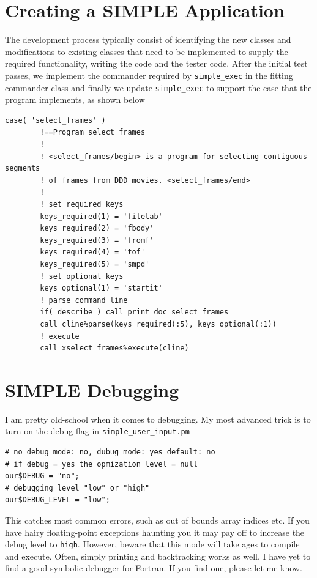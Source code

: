 \documentclass[a4paper,11pt]{article}
\begin{document}
\section{Creating a SIMPLE Application}
The development process typically consist of identifying the new classes and modifications to existing classes that need to be implemented to supply the required functionality, writing the code and the tester code. After the initial test passes,  we implement the commander required by \texttt{simple\_exec} in the fitting commander class and finally we update \texttt{simple\_exec} to support the case that the program implements, as shown below
\begin{verbatim}
case( 'select_frames' )
        !==Program select_frames
        !
        ! <select_frames/begin> is a program for selecting contiguous segments 
        ! of frames from DDD movies. <select_frames/end>
        !
        ! set required keys
        keys_required(1) = 'filetab'
        keys_required(2) = 'fbody'
        keys_required(3) = 'fromf'
        keys_required(4) = 'tof'
        keys_required(5) = 'smpd'
        ! set optional keys
        keys_optional(1) = 'startit'
        ! parse command line
        if( describe ) call print_doc_select_frames
        call cline%parse(keys_required(:5), keys_optional(:1))
        ! execute
        call xselect_frames%execute(cline)
\end{verbatim}

\section{SIMPLE Debugging}
I am pretty old-school when it comes to debugging. My most advanced trick is to turn on the debug flag in \texttt{simple\_user\_input.pm}
\begin{verbatim}
# no debug mode: no, dubug mode: yes default: no
# if debug = yes the opmization level = null
our$DEBUG = "no";
# debugging level "low" or "high"
our$DEBUG_LEVEL = "low";
\end{verbatim}
This catches most common errors, such as out of bounds array indices etc. If you have hairy floating-point exceptions haunting you it may pay off to increase the debug level to \texttt{high}. However, beware that this mode will take ages to compile and execute. Often, simply printing and backtracking works as well. I have yet to find a good symbolic debugger for Fortran. If you find one, please let me know.
\end{document}
